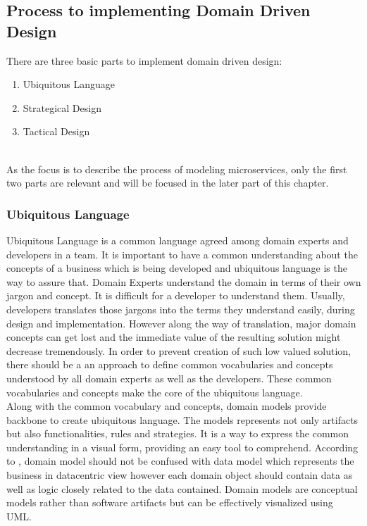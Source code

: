 \subsection{Process to implementing Domain Driven Design}\label{section:domain_driven_design/process_to_domain_driven_design}
There are three basic parts to implement domain driven design:
\begin{enumerate}
\item{Ubiquitous Language}
\item{Strategical Design}
\item{Tactical Design}
\end{enumerate}
\\
As the focus is to describe the process of modeling microservices, only the first two parts are relevant and will be focused in the later part of this chapter.
\subsubsection{Ubiquitous Language}\label{section:domain_driven_design/process_to_domain_driven_design/ubiquitous_language}
Ubiquitous Language is a common language agreed among domain experts and developers in a team. It is important to have a common understanding about the concepts of a business which is being developed and ubiquitous language is the way to assure that. Domain Experts understand the domain in terms of their own jargon and concept. It is difficult for a developer to understand them. Usually, developers translates those jargons into the terms they understand easily, during design and implementation. However along the way of translation, major domain concepts can get lost and the immediate value of the resulting solution might decrease tremendously. In order to prevent creation of such low valued solution, there should be a an approach to define common vocabularies and concepts understood by all domain experts as well as the developers. These common vocabularies and concepts make the core of the ubiquitous language.\cite{Evans:2003aa}\cite{Vernon:2013aa}
\\
Along with the common vocabulary and concepts, domain models provide backbone to create ubiquitous language. The models represents not only artifacts but also functionalities, rules and strategies. It is a way to express the common understanding in a visual form, providing an easy tool to comprehend.\cite{Evans:2003aa}\cite{Fowler:2006aa} According to \cite{Fowler:2003aa}, domain model should not be confused with data model which represents the business in datacentric view however each domain object should contain data as well as logic closely related to the data contained. Domain models are conceptual models rather than software artifacts but can be effectively visualized using \acrshort{UML}.\cite{Scott:2001aa}

